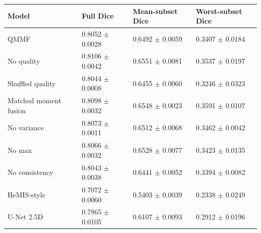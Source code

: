 \begin{tabular}{llll}
\toprule
Model & Full Dice & Mean-subset Dice & Worst-subset Dice \\
\midrule
QMMF & 0.8052 $\pm$ 0.0028 & 0.6492 $\pm$ 0.0059 & 0.3407 $\pm$ 0.0184 \\
No quality & 0.8106 $\pm$ 0.0042 & 0.6551 $\pm$ 0.0081 & 0.3537 $\pm$ 0.0197 \\
Shuffled quality & 0.8044 $\pm$ 0.0008 & 0.6455 $\pm$ 0.0060 & 0.3246 $\pm$ 0.0323 \\
Matched moment fusion & 0.8098 $\pm$ 0.0032 & 0.6548 $\pm$ 0.0023 & 0.3591 $\pm$ 0.0107 \\
No variance & 0.8073 $\pm$ 0.0011 & 0.6512 $\pm$ 0.0068 & 0.3462 $\pm$ 0.0042 \\
No max & 0.8066 $\pm$ 0.0032 & 0.6528 $\pm$ 0.0077 & 0.3423 $\pm$ 0.0135 \\
No consistency & 0.8043 $\pm$ 0.0038 & 0.6441 $\pm$ 0.0052 & 0.3394 $\pm$ 0.0082 \\
HeMIS-style & 0.7072 $\pm$ 0.0060 & 0.5403 $\pm$ 0.0039 & 0.2338 $\pm$ 0.0249 \\
U-Net 2.5D & 0.7865 $\pm$ 0.0105 & 0.6107 $\pm$ 0.0093 & 0.2912 $\pm$ 0.0196 \\
\bottomrule
\end{tabular}
